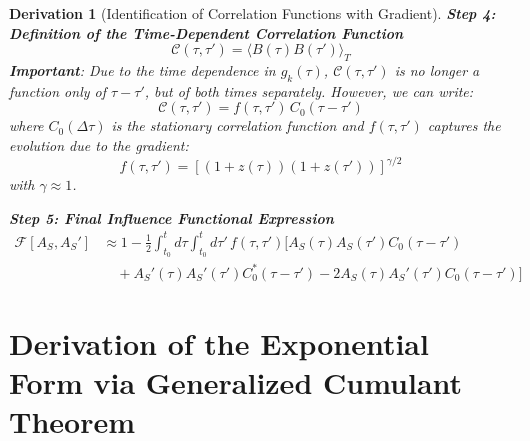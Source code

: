 \documentclass[10pt, a4paper]{article}
\newtheorem{derivation}{Derivation}
\begin{document}
\begin{derivation}[Identification of Correlation Functions with Gradient]
\textbf{Step 4: Definition of the Time-Dependent Correlation Function}
\begin{equation}
\mathcal{C}(\tau, \tau') = \langle B(\tau) B(\tau') \rangle_T
\tag{13.8}
\end{equation}
\textbf{Important}: Due to the time dependence in $g_k(\tau)$, $\mathcal{C}(\tau, \tau')$ is no longer a function only of $\tau-\tau'$, but of both times separately. However, we can write:
\begin{equation}
\mathcal{C}(\tau, \tau') = f(\tau, \tau') \, C_0(\tau - \tau')
\tag{13.9}
\end{equation}
where $C_0(\Delta\tau)$ is the stationary correlation function and $f(\tau, \tau')$ captures the evolution due to the gradient:
\begin{equation}
f(\tau, \tau') = \left[ (1+z(\tau))(1+z(\tau')) \right]^{\gamma/2}
\tag{13.10}
\end{equation}
with $\gamma \approx 1$.

\textbf{Step 5: Final Influence Functional Expression}
\begin{align}
\mathcal{F}[A_S, A_S'] &\approx 1 - \frac{1}{2} \int_{t_0}^{t} d\tau \int_{t_0}^{t} d\tau' \, f(\tau, \tau') \big[ A_S(\tau) A_S(\tau') C_0(\tau - \tau') \\
&\quad + A_S'(\tau) A_S'(\tau') C_0^*(\tau - \tau') - 2 A_S(\tau) A_S'(\tau') C_0(\tau - \tau') \big]
\tag{13.11}
\end{align}
\end{derivation}

\section{Derivation of the Exponential Form via Generalized Cumulant Theorem}
\end{document}
